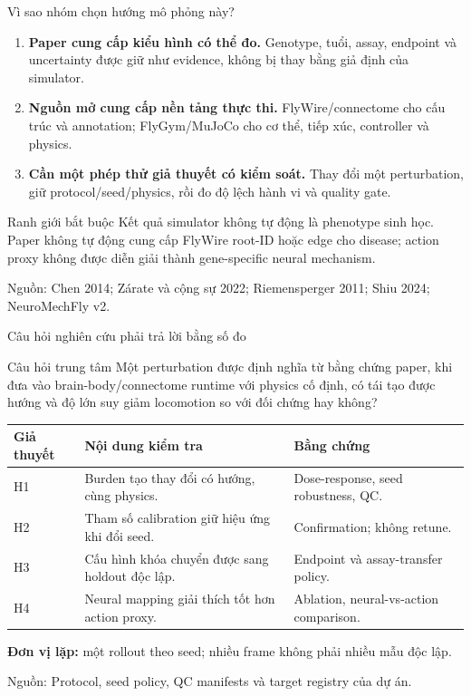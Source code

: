 \documentclass[10pt,aspectratio=169]{beamer}
\newcommand{\kw}[1]{\textcolor{uitblue}{\textbf{#1}}}
\newcommand{\source}[1]{\par\vfill{\fontsize{6.0}{7}\selectfont\color{gray}Nguồn: #1\par}}
\newcommand{\smallgap}{\vspace{0.18cm}}
\begin{document}
\begin{frame}{Vì sao nhóm chọn hướng mô phỏng này?}
\begin{enumerate}\setlength\itemsep{10pt}
  \item \kw{Paper cung cấp kiểu hình có thể đo.} Genotype, tuổi, assay, endpoint và uncertainty được giữ như evidence, không bị thay bằng giả định của simulator.
  \item \kw{Nguồn mở cung cấp nền tảng thực thi.} FlyWire/connectome cho cấu trúc và annotation; FlyGym/MuJoCo cho cơ thể, tiếp xúc, controller và physics.
  \item \kw{Cần một phép thử giả thuyết có kiểm soát.} Thay đổi một perturbation, giữ protocol/seed/physics, rồi đo độ lệch hành vi và quality gate.
\end{enumerate}
\smallgap
\begin{block}{Ranh giới bắt buộc}
Kết quả simulator không tự động là phenotype sinh học. Paper không tự động cung cấp FlyWire root-ID hoặc edge cho disease; action proxy không được diễn giải thành gene-specific neural mechanism.
\end{block}
\source{Chen 2014; Zárate và cộng sự 2022; Riemensperger 2011; Shiu 2024; NeuroMechFly v2.}
\end{frame}

\begin{frame}{Câu hỏi nghiên cứu phải trả lời bằng số đo}
\begin{block}{Câu hỏi trung tâm}
Một perturbation được định nghĩa từ bằng chứng paper, khi đưa vào brain-body/connectome runtime với physics cố định, có tái tạo được hướng và độ lớn suy giảm locomotion so với đối chứng hay không?
\end{block}
\smallgap\scriptsize\renewcommand{\arraystretch}{1.02}
\begin{tabular}{@{}L{1.7cm}L{8.0cm}L{4.3cm}@{}}
\toprule
\textbf{Giả thuyết} & \textbf{Nội dung kiểm tra} & \textbf{Bằng chứng}\\\midrule
H1 & Burden tạo thay đổi có hướng, cùng physics. & Dose-response, seed robustness, QC.\\
H2 & Tham số calibration giữ hiệu ứng khi đổi seed. & Confirmation; không retune.\\
H3 & Cấu hình khóa chuyển được sang holdout độc lập. & Endpoint và assay-transfer policy.\\
H4 & Neural mapping giải thích tốt hơn action proxy. & Ablation, neural-vs-action comparison.\\\bottomrule
\end{tabular}
\smallgap\normalsize
\textbf{Đơn vị lặp:} một rollout theo seed; nhiều frame không phải nhiều mẫu độc lập.
\source{Protocol, seed policy, QC manifests và target registry của dự án.}
\end{frame}
\end{document}

